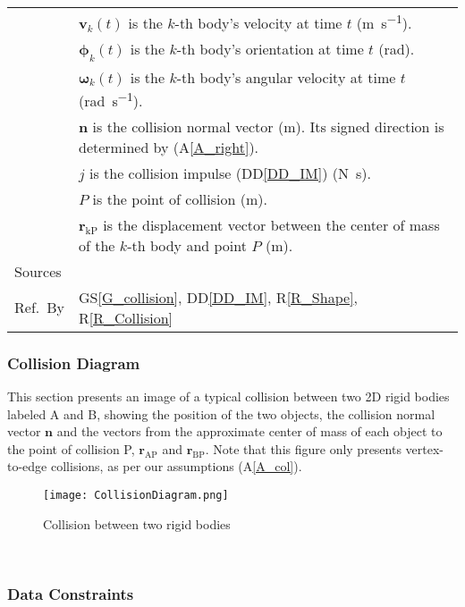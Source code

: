 \documentclass[12pt]{article}
\newcommand{\colAwidth}{0.13\textwidth}
\newcommand{\colBwidth}{0.82\textwidth}
\newcommand{\aref}[1]{A\ref{#1}}
\begin{document}
\begin{minipage}{\textwidth}
\begin{tabular}{| p{\colAwidth} | p{\colBwidth}|}
  & $\mathbf{v}_k(t)$ is the $k$-th body's velocity at time $t$ (\si{\metre\per\second}). \\
  & $\boldsymbol{\phi}_k(t)$ is the $k$-th body's orientation at time $t$ (\si{\radian}). \\
  & $\boldsymbol{\omega}_k(t)$ is the $k$-th body's angular velocity at time $t$ (\si{\radian\per\second}). \\
  & $\mathbf{n}$ is the collision normal vector (\si{\metre}). Its signed direction is determined by (\aref{A_right}). \\
  & $j$ is the collision impulse (DD\ref{DD_IM}) (\si{\newton\second}). \\
  & $P$ is the point of collision (\si{\metre}). \\
  & $\mathbf{r}_\mathrm{kP}$ is the displacement vector between the center of mass of the $k$-th body and point $P$ (\si{\metre}). \\
  \hline
  Sources & \\
  \hline
Ref.\ By & GS\ref{G_collision}, DD\ref{DD_IM}, R\ref{R_Shape}, R\ref{R_Collision} \\
  \hline
\end{tabular}
\end{minipage}

\subsubsection*{Collision Diagram}

This section presents an image of a typical collision between two 2D rigid bodies labeled A and B, showing the position of the two objects, the collision normal vector $\mathbf{n}$ and the vectors from the approximate center of mass of each object to the point of collision P, $\mathbf{r}_\mathrm{AP}$ and $\mathbf{r}_\mathrm{BP}$. Note that this figure only presents vertex-to-edge collisions, as per our assumptions (A\ref{A_col}).

\begin{figure}[htbp]
	\begin{center}
		{
			\texttt{[image: CollisionDiagram.png]}
		}
		\bigskip
		\caption{\label{Fig_collision}Collision between two rigid bodies}
	\end{center}
\end{figure}

~\newline

\subsubsection{Data Constraints} \label{sec_DataConstraints}    
\end{document}
